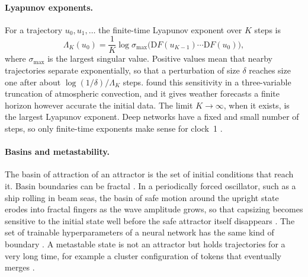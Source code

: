 \paragraph{Lyapunov exponents.} For a trajectory $u_0,u_1,\dots$ the finite-time Lyapunov exponent over $K$ steps is
\begin{equation}
\Lambda_K(u_0) = \frac{1}{K}\log \sigma_{\max}\big(\mathrm{D}F(u_{K-1})\cdots \mathrm{D}F(u_0)\big),
\label{eq:ftle}
\end{equation}
where $\sigma_{\max}$ is the largest singular value. Positive values mean that nearby trajectories separate exponentially, so that a perturbation of size $\delta$ reaches size one after about $\log(1/\delta)/\Lambda_K$ steps. \citet{lorenz1963deterministic} found this sensitivity in a three-variable truncation of atmospheric convection, and it gives weather forecasts a finite horizon however accurate the initial data. The limit $K\to\infty$, when it exists, is the largest Lyapunov exponent. Deep networks have a fixed and small number of steps, so only finite-time exponents make sense for clock~1 \citep{storm2023finitetime}.

\paragraph{Basins and metastability.} The basin of attraction of an attractor is the set of initial conditions that reach it. Basin boundaries can be fractal \citep{mcdonald1985fractal}. In a periodically forced oscillator, such as a ship rolling in beam seas, the basin of safe motion around the upright state erodes into fractal fingers as the wave amplitude grows, so that capsizing becomes sensitive to the initial state well before the safe attractor itself disappears \citep{thompson1990fractal,thompson1997designing}. The set of trainable hyperparameters of a neural network has the same kind of boundary \citep{sohldickstein2024boundary}. A metastable state is not an attractor but holds trajectories for a very long time, for example a cluster configuration of tokens that eventually merges \citep{geshkovski2024dynamic}.

